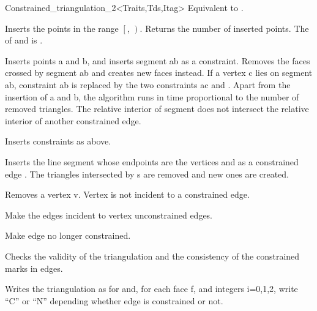 \begin{ccRefClass}{Constrained_triangulation_2<Traits,Tds,Itag>}
{Equivalent to .}

{Inserts the points in the range
 $\left[\right.$, $\left.\right)$.
 Returns the number of inserted points.
 \ccPrecond The  of  and 
 is .}

{ Inserts points a and b, and inserts segment ab as a
constraint. Removes the faces crossed by segment ab and creates new
faces instead. If a vertex c lies on segment ab, constraint ab is
replaced by the two constraints ac and . Apart from the insertion of
a and b, the algorithm runs in time proportional to the number of
removed triangles. 
\ccPrecond The relative interior of segment  does not
intersect the relative interior of another constrained edge.}

{Inserts constraints  as above.}

{ Inserts the line segment  whose endpoints are the vertices 
 and
  as a constrained edge . The triangles intersected by s
are removed and new ones are created.}


{ Removes a vertex v. 
\ccPrecond Vertex   is not incident to a constrained edge.}

{Make the edges incident to vertex  unconstrained edges.}

{ Make edge   no longer constrained.}

\begin{ccAdvanced}
{Checks the validity of the triangulation and
the consistency of the constrained marks in edges.}

\end{ccAdvanced}



{Writes the triangulation as for  and, for each face f, and integers i=0,1,2,
write ``C'' or ``N'' depending whether edge 
 is constrained or not.}


\end{ccRefClass}
